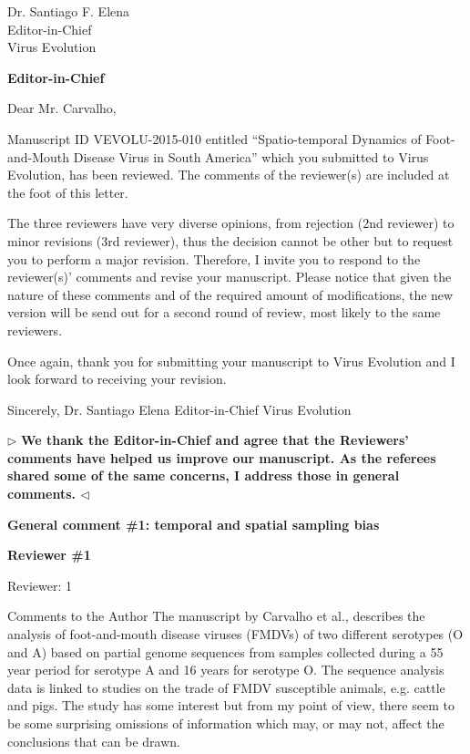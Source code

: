 \documentclass[ucla,biomath,12pt,noaddrfooter,datefrom]{UC_letter}
\newenvironment{reply}{$\triangleright$\bf}{$\triangleleft$}
\begin{document}
\begin{letter}{
Dr. Santiago F. Elena \\
Editor-in-Chief \\
Virus Evolution
}
\clearpage

\textbf{Editor-in-Chief}

Dear Mr. Carvalho,

Manuscript ID VEVOLU-2015-010 entitled ``Spatio-temporal Dynamics of Foot-and-Mouth Disease Virus in South America'' which you submitted to Virus Evolution, has been reviewed.  
The comments of the reviewer(s) are included at the foot of this letter.

The three reviewers have very diverse opinions, from rejection (2nd reviewer) to minor revisions (3rd reviewer), thus the decision cannot be other but to request you to perform a major revision.  
Therefore, I invite you to respond to the reviewer(s)' comments and revise your manuscript.  
Please notice that given the nature of these comments and of the required amount of modifications, the new version will be send out for a second round of review, most likely to the same reviewers.

Once again, thank you for submitting your manuscript to Virus Evolution and I look forward to receiving your revision.

Sincerely,
Dr. Santiago Elena
Editor-in-Chief
Virus Evolution

\begin{reply}
We thank the Editor-in-Chief and agree that the Reviewers' comments have helped us improve our manuscript. 
As the referees shared some of the same concerns, I address those in general comments.
\end{reply}


\textbf{General comment \#1: temporal and spatial sampling bias}


\textbf{Reviewer \#1}

Reviewer: 1

Comments to the Author
The manuscript by Carvalho et al., describes the analysis of foot-and-mouth disease viruses (FMDVs) of two different serotypes (O and A) based on partial genome sequences from samples collected during a 55 year period for serotype A and 16 years for serotype O. 
The sequence analysis data is linked to studies on the trade of FMDV susceptible animals, e.g. cattle and pigs. 
The study has some interest but from my point of view, there seem to be some surprising omissions of information which may, or may not, affect the conclusions that can be drawn.


\end{letter}
\end{document}
